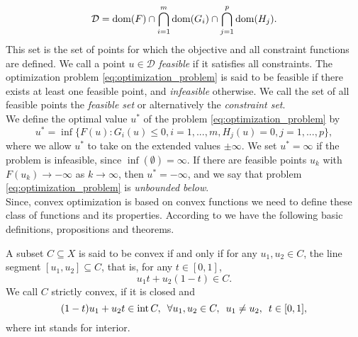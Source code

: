         \begin{equation}
            \mathcal{D} = \textnormal{dom}(F) \cap \bigcap_{i = 1}^{m} \textnormal{dom}(G_{i}) \cap \bigcap_{j = 1}^{p} \textnormal{dom}(H_{j}).
            \label{eq:domain_of_optimization_problem}
        \end{equation}
    This set is the set of points for which the objective and all constraint functions are defined. We call a point $u \in \mathcal{D}$ \textit{feasible} if it satisfies all constraints. The optimization problem \ref{eq:optimization_problem} is said to be feasible if there exists at least one feasible point, and \textit{infeasible} otherwise. We call the set of all feasible points the \textit{feasible set} or alternatively the \textit{constraint set}.\\
    We define the optimal value $u^{\ast}$ of the problem \ref{eq:optimization_problem} by
        \begin{equation}
            u^{\ast} = \inf \big\{ F(u) : G_{i}(u) \le 0, i = 1, ..., m, H_{j}(u) = 0, j = 1, ..., p \big\},
        \end{equation}
    where we allow $u^{\ast}$ to take on the extended values $\pm \infty$. We set $u^{\ast} = \infty$ if the problem is infeasible, since $\inf(\emptyset) = \infty$. If there are feasible points $u_{k}$ with $F(u_{k}) \longrightarrow -\infty$ as $k \longrightarrow \infty$, then $u^{\ast} = -\infty$, and we say that problem \ref{eq:optimization_problem} is \textit{unbounded below}.\\

    Since, convex optimization is based on convex functions we need to define these class of functions and its properties.
    According to \cite{Chambolle-et-al-10} we have the following basic definitions, propositions and theorems.

    \begin{definition} %
    \label{def:convex_set}

        A subset $C \subseteq X$ is said to be convex if and only if for any $u_{1}, u_{2} \in C$, the line segment $[u_{1}, u_{2}] \subseteq C$, that is, for any $t \in [0, 1]$,
            \begin{equation}
                u_{1}t + u_{2}(1 - t) \in C.
                \label{eq:convex_set}
            \end{equation}
        We call $C$ strictly convex, if it is closed and
            \begin{equation}
                (1 - t)u_{1} + u_{2}t \in \textnormal{int}\,C, \,\,\, \forall u_{1}, u_{2} \in C, \,\,\, u_{1} \ne u_{2}, \,\,\, t \in [0, 1],
                \label{eq:strictly_convex_set}
            \end{equation}
        where \textnormal{int} stands for interior.

    \end{definition}

